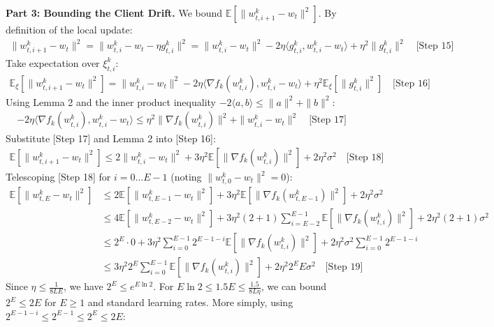 \documentclass{article}
\begin{document}
\textbf{Part 3: Bounding the Client Drift.} We bound $\mathbb{E}[\|w_{t,i+1}^k - w_t\|^2]$. By definition of the local update:
\begin{align}
\|w_{t,i+1}^k - w_t\|^2 = \|w_{t,i}^k - w_t - \eta g_{t,i}^k\|^2 = \|w_{t,i}^k - w_t\|^2 - 2\eta \langle g_{t,i}^k, w_{t,i}^k - w_t \rangle + \eta^2 \|g_{t,i}^k\|^2 \quad \text{[Step 15]}
\end{align}
Take expectation over $\xi_{t,i}^k$:
\begin{align}
\mathbb{E}_{\xi}[\|w_{t,i+1}^k - w_t\|^2] = \|w_{t,i}^k - w_t\|^2 - 2\eta \langle \nabla f_k(w_{t,i}^k), w_{t,i}^k - w_t \rangle + \eta^2 \mathbb{E}_{\xi}[\|g_{t,i}^k\|^2] \quad \text{[Step 16]}
\end{align}
Using Lemma 2 and the inner product inequality $-2\langle a, b \rangle \leq \|a\|^2 + \|b\|^2$:
\begin{align}
- 2\eta \langle \nabla f_k(w_{t,i}^k), w_{t,i}^k - w_t \rangle \leq \eta^2 \|\nabla f_k(w_{t,i}^k)\|^2 + \|w_{t,i}^k - w_t\|^2 \quad \text{[Step 17]}
\end{align}
Substitute [Step 17] and Lemma 2 into [Step 16]:
\begin{align}
\mathbb{E}[\|w_{t,i+1}^k - w_t\|^2] \leq 2\|w_{t,i}^k - w_t\|^2 + 3\eta^2 \mathbb{E}[\|\nabla f_k(w_{t,i}^k)\|^2] + 2\eta^2 \sigma^2 \quad \text{[Step 18]}
\end{align}
Telescoping [Step 18] for $i=0 \dots E-1$ (noting $\|w_{t,0}^k - w_t\|^2 = 0$):
\begin{align}
\mathbb{E}[\|w_{t,E}^k - w_t\|^2] &\leq 2\mathbb{E}[\|w_{t,E-1}^k - w_t\|^2] + 3\eta^2 \mathbb{E}[\|\nabla f_k(w_{t,E-1}^k)\|^2] + 2\eta^2 \sigma^2 \\
&\leq 4\mathbb{E}[\|w_{t,E-2}^k - w_t\|^2] + 3\eta^2(2+1) \sum_{i=E-2}^{E-1}\mathbb{E}[\|\nabla f_k(w_{t,i}^k)\|^2] + 2\eta^2(2+1)\sigma^2 \\
&\leq 2^E \cdot 0 + 3\eta^2 \sum_{i=0}^{E-1} 2^{E-1-i} \mathbb{E}[\|\nabla f_k(w_{t,i}^k)\|^2] + 2\eta^2 \sigma^2 \sum_{i=0}^{E-1} 2^{E-1-i} \\
&\leq 3\eta^2 2^E \sum_{i=0}^{E-1} \mathbb{E}[\|\nabla f_k(w_{t,i}^k)\|^2] + 2\eta^2 2^E E \sigma^2 \quad \text{[Step 19]}
\end{align}
Since $\eta \leq \frac{1}{8LE}$, we have $2^E \leq e^{E \ln 2}$. For $E \ln 2 \leq 1.5 E \leq \frac{1.5}{8L\eta}$, we can bound $2^E \leq 2E$ for $E \geq 1$ and standard learning rates. More simply, using $2^{E-1-i} \leq 2^{E-1} \leq 2^E \leq 2E$:
\end{document}

